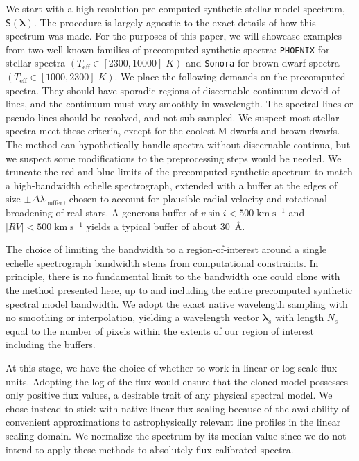 \documentclass[modern]{aastex631}
\def\kmps{\mathrm{km}\;\mathrm{s}^{-1}}
\begin{document}
We start with a high resolution pre-computed synthetic stellar model spectrum, $\mathsf{S}(\bm{\lambda})$. The procedure is largely agnostic to the exact details of how this spectrum was made. For the purposes of this paper, we will showcase examples from two well-known families of precomputed synthetic spectra: \texttt{PHOENIX} \citep{husser13} for stellar spectra $(T_{\mathrm{eff}}\in [2300, 10000]\;K)$ and \texttt{Sonora} \citep{2021ApJ...920...85M} for brown dwarf spectra $(T_{\mathrm{eff}}\in [1000, 2300]\;K)$. We place the following demands on the precomputed spectra. They should have sporadic regions of discernable continuum devoid of lines, and the continuum must vary smoothly in wavelength. The spectral lines or pseudo-lines should be resolved, and not sub-sampled. We suspect most stellar spectra meet these criteria, except for the coolest M dwarfs and brown dwarfs. The method can hypothetically handle spectra without discernable continua, but we suspect some modifications to the preprocessing steps would be needed. We truncate the red and blue limits of the precomputed synthetic spectrum to match a high-bandwidth echelle spectrograph, extended with a buffer at the edges of size $\pm \Delta \lambda_{\mathrm{buffer}}$, chosen to account for plausible radial velocity and rotational broadening of real stars. A generous buffer of $v \sin{i} < 500 \;\kmps$ and $|RV|<500 \;\kmps$ yields a typical buffer of about 30~\AA.

The choice of limiting the bandwidth to a region-of-interest around a single echelle spectrograph bandwidth stems from computational constraints. In principle, there is no fundamental limit to the bandwidth one could clone with the method presented here, up to and including the entire precomputed synthetic spectral model bandwidth. We adopt the exact native wavelength sampling with no smoothing or interpolation, yielding a wavelength vector $\bm{\lambda}_s$ with length $N_\mathrm{s}$ equal to the number of pixels within the extents of our region of interest including the buffers.

At this stage, we have the choice of whether to work in linear or log scale flux units. Adopting the log of the flux would ensure that the cloned model possesses only positive flux values, a desirable trait of any physical spectral model. We chose instead to stick with native linear flux scaling because of the availability of convenient approximations to astrophysically relevant line profiles in the linear scaling domain. We normalize the spectrum by its median value since we do not intend to apply these methods to absolutely flux calibrated spectra.
\end{document}
